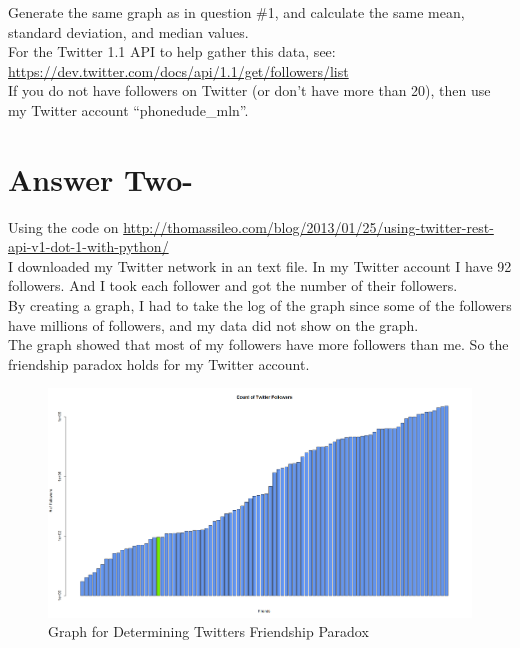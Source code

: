 \documentclass[letterpaper,11pt]{article}
\begin{document}
Generate the same graph as in question \#1, and calculate the same mean, standard deviation, and median values. \\

For the Twitter 1.1 API to help gather this data, see: \\
\url{https://dev.twitter.com/docs/api/1.1/get/followers/list} \\

If you do not have followers on Twitter (or don't have more than 20), then use my Twitter account ``phonedude\_mln''.

\pagebreak
\section*{Answer Two-}

Using the code on \url{http://thomassileo.com/blog/2013/01/25/using-twitter-rest-api-v1-dot-1-with-python/}\\
I downloaded my Twitter network in an text file. In my Twitter account I have 92 followers. And I took each follower and got the number of their followers. \\

By creating a graph, I had to take the log of the graph since some of the followers have millions of followers, and my data did not show on the graph.\\

The graph showed that most of my followers have more followers than me. So the friendship paradox holds for my Twitter account.

\begin{figure}[!ht]
\centering
\includegraphics[width=1\textwidth]{2.png}
\caption{Graph for Determining Twitters Friendship Paradox}
\label{fig:Graph for Determining Twitters Friendship Paradox}
\end{figure}
\end{document}
